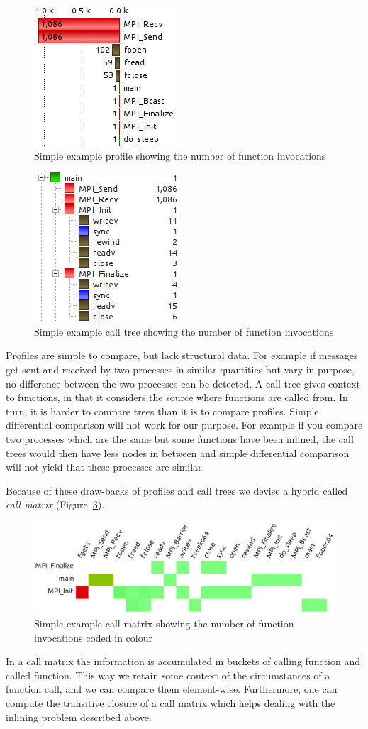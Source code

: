 \documentclass[b5paper, final, hauptseminar]{zih-template}
\begin{document}
\begin{figure}[htbp]
	\centering
	\includegraphics[width=0.25\linewidth]{id-profile}
	\caption{Simple example profile showing the number of function invocations}
	\label{fig:id-profile}
\end{figure}

\begin{figure}[htbp]
	\centering
	\includegraphics[width=0.3\linewidth]{id-call-tree}
	\caption{Simple example call tree showing the number of function invocations}
	\label{fig:id-call-tree}
\end{figure}

Profiles are simple to compare, but lack structural data. For example if messages get sent and received by two processes in similar quantities but vary in purpose, no difference between the two processes can be detected.
A call tree gives context to functions, in that it considers the source where functions are called from.
In turn, it is harder to compare trees than it is to compare profiles. Simple differential comparison will not work for our purpose. For example if you compare two processes which are the same but some functions have been inlined, the call trees would then have less nodes in between and simple differential comparison will not yield that these processes are similar.

Because of these draw-backs of profiles and call trees we devise a hybrid called \emph{call matrix} (Figure~\ref{fig:id-call-matrix}).
\begin{figure}[htbp]
	\centering
	\includegraphics[width=0.8\linewidth]{id-call-matrix}
	\caption{Simple example call matrix showing the number of function invocations coded in colour}
	\label{fig:id-call-matrix}
\end{figure}
In a call matrix the information is accumulated in buckets of calling function and called function.
This way we retain some context of the circumstances of a function call, and we can compare them element-wise.
Furthermore, one can compute the transitive closure of a call matrix which helps dealing with the inlining problem described above.
\end{document}
